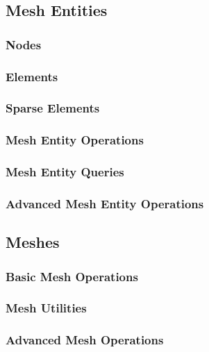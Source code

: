 
\subsection{Mesh Entities}
\label{sec:entities}

\subsubsection{Nodes}
\label{sec:nodes}

\subsubsection{Elements}
\label{sec:elements}

\subsubsection{Sparse Elements}
\label{sec:sparse}

\subsubsection{Mesh Entity Operations}

\subsubsection{Mesh Entity Queries}

\subsubsection{Advanced Mesh Entity Operations}

\subsection{Meshes}
\label{sec:meshes}

\subsubsection{Basic Mesh Operations}

\subsubsection{Mesh Utilities}

\subsubsection{Advanced Mesh Operations}

